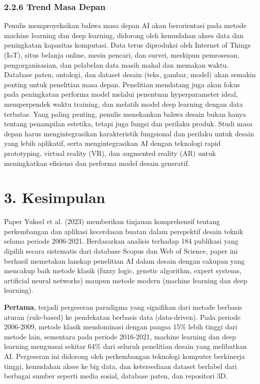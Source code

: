 \documentclass{article}
\begin{document}
\subsubsection*{2.2.6 Trend Masa Depan}
Penulis memproyeksikan bahwa masa depan AI akan berorientasi pada metode machine learning dan deep learning, didorong oleh kemudahan akses data dan peningkatan kapasitas komputasi. Data terus diproduksi oleh Internet of Things (IoT), situs belanja online, mesin pencari, dan survei, meskipun pemrosesan, pengorganisasian, dan pelabelan data masih mahal dan memakan waktu. Database paten, ontologi, dan dataset desain (teks, gambar, model) akan semakin penting untuk penelitian masa depan. Penelitian mendatang juga akan fokus pada peningkatan performa model melalui penentuan hyperparameter ideal, memperpendek waktu training, dan melatih model deep learning dengan data terbatas. Yang paling penting, penulis menekankan bahwa desain bukan hanya tentang penampilan estetika, tetapi juga fungsi dan perilaku produk. Studi masa depan harus mengintegrasikan karakteristik fungsional dan perilaku untuk desain yang lebih aplikatif, serta mengintegrasikan AI dengan teknologi rapid prototyping, virtual reality (VR), dan augmented reality (AR) untuk meningkatkan efisiensi dan performa model desain generatif.
\section*{3. Kesimpulan} %
Paper Yuksel et al. (2023) memberikan tinjauan komprehensif tentang perkembangan dan aplikasi kecerdasan buatan dalam perspektif desain teknik selama periode 2006-2021. Berdasarkan analisis terhadap 184 publikasi yang dipilih secara sistematis dari database Scopus dan Web of Science, paper ini berhasil memetakan lanskap penelitian AI dalam desain dengan cakupan yang mencakup baik metode klasik (fuzzy logic, genetic algorithm, expert systems, artificial neural networks) maupun metode modern (machine learning dan deep learning).

\textbf{Pertama}, terjadi pergeseran paradigma yang signifikan dari metode berbasis aturan (rule-based) ke pendekatan berbasis data (data-driven). Pada periode 2006-2009, metode klasik mendominasi dengan pangsa 15\% lebih tinggi dari metode lain, sementara pada periode 2016-2021, machine learning dan deep learning menguasai sekitar 64\% dari seluruh penelitian desain yang melibatkan AI. Pergeseran ini didorong oleh perkembangan teknologi komputer berkinerja tinggi, kemudahan akses ke big data, dan ketersediaan dataset berlabel dari berbagai sumber seperti media sosial, database paten, dan repositori 3D.
\end{document}
